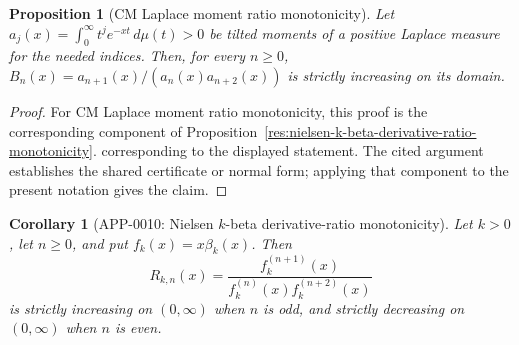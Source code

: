 \documentclass[11pt]{article}
\numberwithin{equation}{section}
\newtheorem{proposition}[theorem]{Proposition}
\newtheorem{corollary}[theorem]{Corollary}
\theoremstyle{definition}
\theoremstyle{remark}
\newcommand{\1}{\mathbf 1}
\begin{document}
\begin{proposition}[CM Laplace moment ratio monotonicity]
\label{res:cm-laplace-moment-ratio-monotonicity}
Let \(a_j(x)=\int_0^\infty t^j e^{-xt}\,d\mu(t)>0\) be tilted moments of a positive Laplace measure for the needed indices. Then, for every \(n\ge0\), \(B_n(x)=a_{n+1}(x)/(a_n(x)a_{n+2}(x))\) is strictly increasing on its domain.
\end{proposition}

\begin{proof}
For CM Laplace moment ratio monotonicity, this proof is the corresponding component of Proposition~\ref{res:nielsen-k-beta-derivative-ratio-monotonicity}.  corresponding to the displayed statement.  The cited argument establishes the shared certificate or normal form; applying that component to the present notation gives the claim.
\end{proof}

\begin{corollary}[APP-0010: Nielsen \(k\)-beta derivative-ratio monotonicity]
\label{thm:nielsen-k-beta-derivative-ratio}
Let \(k>0\), let \(n\ge0\), and put \(f_k(x)=x\beta_k(x)\).  Then
\begin{equation}
\label{eq:nielsen-k-beta-ratio}
R_{k,n}(x)=
\frac{f_k^{(n+1)}(x)}
{f_k^{(n)}(x)f_k^{(n+2)}(x)}
\end{equation}
is strictly increasing on \((0,\infty)\) when \(n\) is odd, and strictly decreasing on \((0,\infty)\) when \(n\) is even.


\end{corollary}
\end{document}
